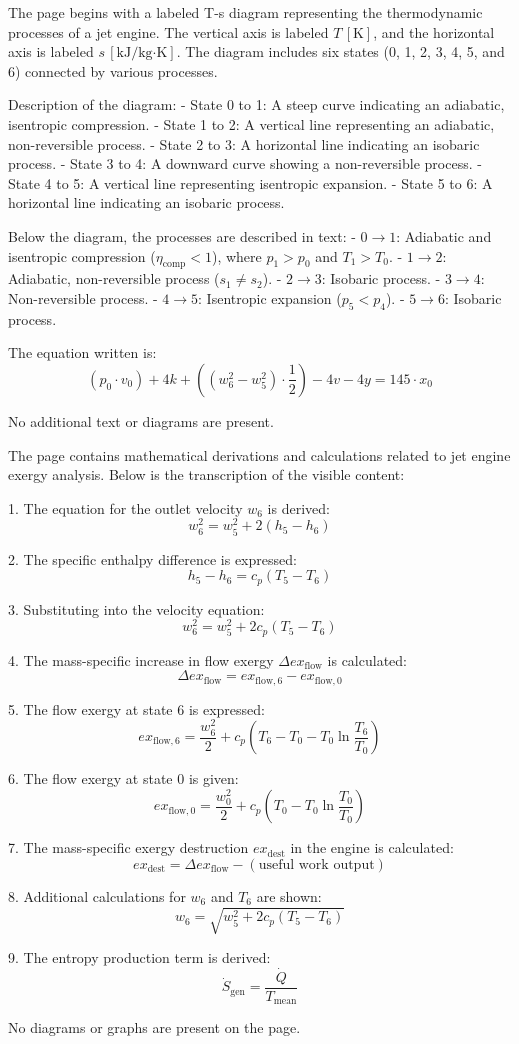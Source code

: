 The page begins with a labeled T-s diagram representing the thermodynamic processes of a jet engine. The vertical axis is labeled \( T \, [\text{K}] \), and the horizontal axis is labeled \( s \, [\text{kJ/kg·K}] \). The diagram includes six states (0, 1, 2, 3, 4, 5, and 6) connected by various processes.  

Description of the diagram:  
- State 0 to 1: A steep curve indicating an adiabatic, isentropic compression.  
- State 1 to 2: A vertical line representing an adiabatic, non-reversible process.  
- State 2 to 3: A horizontal line indicating an isobaric process.  
- State 3 to 4: A downward curve showing a non-reversible process.  
- State 4 to 5: A vertical line representing isentropic expansion.  
- State 5 to 6: A horizontal line indicating an isobaric process.  

Below the diagram, the processes are described in text:  
- \( 0 \to 1 \): Adiabatic and isentropic compression (\( \eta_{\text{comp}} < 1 \)), where \( p_1 > p_0 \) and \( T_1 > T_0 \).  
- \( 1 \to 2 \): Adiabatic, non-reversible process (\( s_1 \neq s_2 \)).  
- \( 2 \to 3 \): Isobaric process.  
- \( 3 \to 4 \): Non-reversible process.  
- \( 4 \to 5 \): Isentropic expansion (\( p_5 < p_4 \)).  
- \( 5 \to 6 \): Isobaric process.

The equation written is:  
\[
(p_0 \cdot v_0) + 4k + \left( (w_6^2 - w_5^2) \cdot \frac{1}{2} \right) - 4v - 4y = 145 \cdot x_0
\]  

No additional text or diagrams are present.

The page contains mathematical derivations and calculations related to jet engine exergy analysis. Below is the transcription of the visible content:

1. The equation for the outlet velocity \( w_6 \) is derived:
\[
w_6^2 = w_5^2 + 2 \left( h_5 - h_6 \right)
\]

2. The specific enthalpy difference is expressed:
\[
h_5 - h_6 = c_p \left( T_5 - T_6 \right)
\]

3. Substituting into the velocity equation:
\[
w_6^2 = w_5^2 + 2 c_p \left( T_5 - T_6 \right)
\]

4. The mass-specific increase in flow exergy \( \Delta ex_{\text{flow}} \) is calculated:
\[
\Delta ex_{\text{flow}} = ex_{\text{flow},6} - ex_{\text{flow},0}
\]

5. The flow exergy at state 6 is expressed:
\[
ex_{\text{flow},6} = \frac{w_6^2}{2} + c_p \left( T_6 - T_0 - T_0 \ln \frac{T_6}{T_0} \right)
\]

6. The flow exergy at state 0 is given:
\[
ex_{\text{flow},0} = \frac{w_0^2}{2} + c_p \left( T_0 - T_0 \ln \frac{T_0}{T_0} \right)
\]

7. The mass-specific exergy destruction \( ex_{\text{dest}} \) in the engine is calculated:
\[
ex_{\text{dest}} = \Delta ex_{\text{flow}} - \left( \text{useful work output} \right)
\]

8. Additional calculations for \( w_6 \) and \( T_6 \) are shown:
\[
w_6 = \sqrt{w_5^2 + 2 c_p \left( T_5 - T_6 \right)}
\]

9. The entropy production term is derived:
\[
\dot{S}_{\text{gen}} = \frac{\dot{Q}}{T_{\text{mean}}}
\]

No diagrams or graphs are present on the page.